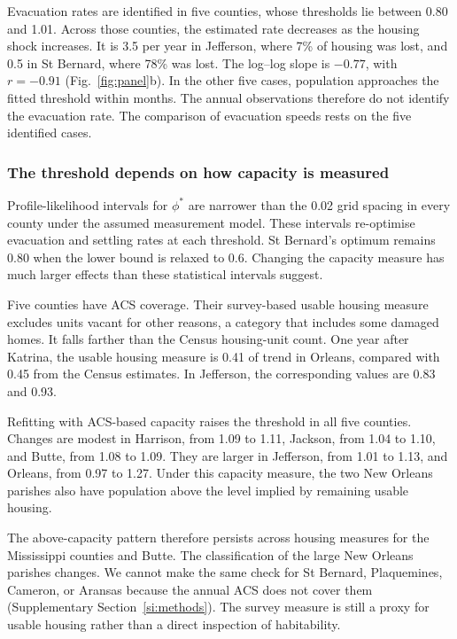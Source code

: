 \documentclass[11pt]{article}
\begin{document}
Evacuation rates are identified in five counties, whose thresholds lie between 0.80 and 1.01. Across those counties, the estimated rate decreases as the housing shock increases. It is 3.5 per year in Jefferson, where 7\% of housing was lost, and 0.5 in St Bernard, where 78\% was lost. The log--log slope is $-0.77$, with $r=-0.91$ (Fig.~\ref{fig:panel}b). In the other five cases, population approaches the fitted threshold within months. The annual observations therefore do not identify the evacuation rate. The comparison of evacuation speeds rests on the five identified cases.

\subsubsection{The threshold depends on how capacity is measured}
Profile-likelihood intervals for $\phi^*$ are narrower than the 0.02 grid spacing in every county under the assumed measurement model. These intervals re-optimise evacuation and settling rates at each threshold. St Bernard's optimum remains 0.80 when the lower bound is relaxed to 0.6. Changing the capacity measure has much larger effects than these statistical intervals suggest.

Five counties have ACS coverage. Their survey-based usable housing measure excludes units vacant for other reasons, a category that includes some damaged homes. It falls farther than the Census housing-unit count. One year after Katrina, the usable housing measure is 0.41 of trend in Orleans, compared with 0.45 from the Census estimates. In Jefferson, the corresponding values are 0.83 and 0.93.

Refitting with ACS-based capacity raises the threshold in all five counties. Changes are modest in Harrison, from 1.09 to 1.11, Jackson, from 1.04 to 1.10, and Butte, from 1.08 to 1.09. They are larger in Jefferson, from 1.01 to 1.13, and Orleans, from 0.97 to 1.27. Under this capacity measure, the two New Orleans parishes also have population above the level implied by remaining usable housing.

The above-capacity pattern therefore persists across housing measures for the Mississippi counties and Butte. The classification of the large New Orleans parishes changes. We cannot make the same check for St Bernard, Plaquemines, Cameron, or Aransas because the annual ACS does not cover them (Supplementary Section~\ref{si:methods}). The survey measure is still a proxy for usable housing rather than a direct inspection of habitability.
\end{document}
